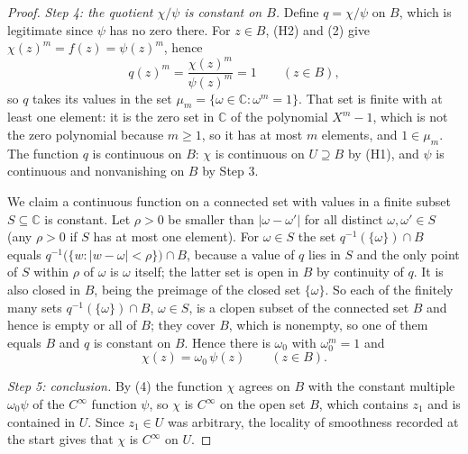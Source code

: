 \begin{proof}
\emph{Step 4: the quotient $\chi/\psi$ is constant on $B$.}  Define
$q=\chi/\psi$ on $B$, which is legitimate since $\psi$ has no zero there.  For
$z\in B$, (H2) and (2) give $\chi(z)^{m}=f(z)=\psi(z)^{m}$, hence
\begin{equation}\tag{3}
  q(z)^{m}=\frac{\chi(z)^{m}}{\psi(z)^{m}}=1\qquad(z\in B),
\end{equation}
so $q$ takes its values in the set
$\mu_m=\{\omega\in\mathbb{C}:\omega^{m}=1\}$.  That set is finite with at
least one element: it is the zero set in $\mathbb{C}$ of the polynomial
$X^{m}-1$, which is not the zero polynomial because $m\ge1$, so it has at most
$m$ elements, and $1\in\mu_m$.  The function $q$ is continuous on $B$: $\chi$
is continuous on $U\supseteq B$ by (H1), and $\psi$ is continuous and
nonvanishing on $B$ by Step 3.

We claim a continuous function on a connected set with values in a finite
subset $S\subseteq\mathbb{C}$ is constant.  Let $\rho>0$ be smaller than
$|\omega-\omega'|$ for all distinct $\omega,\omega'\in S$ (any $\rho>0$ if $S$
has at most one element).  For $\omega\in S$ the set
$q^{-1}(\{\omega\})\cap B$ equals
$q^{-1}\bigl(\{w:|w-\omega|<\rho\}\bigr)\cap B$, because a value of $q$ lies
in $S$ and the only point of $S$ within $\rho$ of $\omega$ is $\omega$ itself;
the latter set is open in $B$ by continuity of $q$.  It is also closed in $B$,
being the preimage of the closed set $\{\omega\}$.  So each of the finitely
many sets $q^{-1}(\{\omega\})\cap B$, $\omega\in S$, is a clopen subset of the
connected set $B$ and hence is empty or all of $B$; they cover $B$, which is
nonempty, so one of them equals $B$ and $q$ is constant on $B$.  Hence there is $\omega_0$ with
$\omega_0^{m}=1$ and
\begin{equation}\tag{4}
  \chi(z)=\omega_0\,\psi(z)\qquad(z\in B).
\end{equation}

\emph{Step 5: conclusion.}  By (4) the function $\chi$ agrees on $B$ with the
constant multiple $\omega_0\psi$ of the $C^\infty$ function $\psi$, so $\chi$
is $C^\infty$ on the open set $B$, which contains $z_1$ and is contained in
$U$.  Since $z_1\in U$ was arbitrary, the locality of smoothness recorded at
the start gives that $\chi$ is $C^\infty$ on $U$.
\end{proof}
